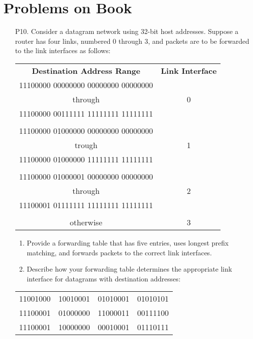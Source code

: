 \section{Problems on Book}

\begin{enumerate}
    \item[P10.] Consider a datagram network using 32-bit host addresses. Suppose a router has four links, numbered 0 through 3, and packets are to be forwarded to the link interfaces as follows:
    \begin{table}[H]
        \centering
        \begin{tabular}{cc}
            \textbf{Destination Address Range} & \textbf{Link Interface} \\
            11100000 00000000 00000000 00000000 & \\
            through & 0 \\
            11100000 00111111 11111111 11111111 & \\
             & \\
            11100000 01000000 00000000 00000000 & \\
            trough & 1 \\
            11100000 01000000 11111111 11111111 & \\
             & \\
            11100000 01000001 00000000 00000000 & \\
            through & 2 \\
            11100001 01111111 11111111 11111111 & \\
             & \\
            otherwise & 3 \\
        \end{tabular}
        \label{tab:p10}
    \end{table}
    \begin{enumerate}
        \item Provide a forwarding table that has five entries, uses longest prefix matching, and forwards packets to the correct link interfaces.
        \item Describe how your forwarding table determines the appropriate link interface for datagrams with destination addresses:
    \end{enumerate}

        \begin{table}[H]
            \centering
            \begin{tabular}{cccc}
                11001000 & 10010001 & 01010001 & 01010101 \\
                11100001 & 01000000 & 11000011 & 00111100 \\
                11100001 & 10000000 & 00010001 & 01110111 \\
            \end{tabular}
            \label{tab:p10_b2}
        \end{table}


\end{enumerate}
